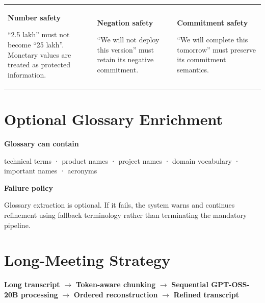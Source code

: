 \documentclass[9pt,a4paper]{extarticle}
\begin{document}
\vspace{4pt}
\begin{tabularx}{\textwidth}{@{}XXX@{}}
\begin{card}\textbf{Number safety}\par “2.5 lakh” must not become “25 lakh”. Monetary values are treated as protected information.
\end{card}&
\begin{card}\textbf{Negation safety}\par “We will not deploy this version” must retain its negative commitment.
\end{card}&
\begin{card}\textbf{Commitment safety}\par “We will complete this tomorrow” must preserve its commitment semantics.
\end{card}
\end{tabularx}

\vspace{4pt}
\section*{Optional Glossary Enrichment}
\begin{minipage}[t]{0.48\textwidth}
\begin{card}
\textbf{Glossary can contain}\par
technical terms · product names · project names · domain vocabulary · important names · acronyms
\end{card}
\end{minipage}\hfill
\begin{minipage}[t]{0.48\textwidth}
\begin{card}
\textbf{Failure policy}\par
Glossary extraction is optional. If it fails, the system warns and continues refinement using fallback terminology rather than terminating the mandatory pipeline.
\end{card}
\end{minipage}

\vspace{4pt}
\section*{Long-Meeting Strategy}
\begin{card}
\centering
\textbf{Long transcript} $\rightarrow$ \textbf{Token-aware chunking} $\rightarrow$ \textbf{Sequential GPT-OSS-20B processing} $\rightarrow$ \textbf{Ordered reconstruction} $\rightarrow$ \textbf{Refined transcript}
\end{card}
\end{document}
